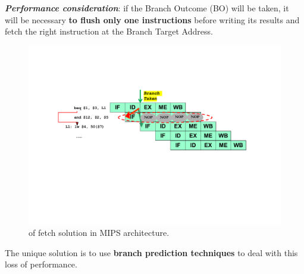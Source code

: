 \begin{itemize}
    \textbf{\emph{Performance consideration}}: if the Branch Outcome (BO) will be taken, it will be necessary \textbf{to flush only one instructions} before writing its results and fetch the right instruction at the Branch Target Address.
    \begin{figure}[!htp]
        \centering
        \includegraphics[width=\textwidth]{img/early-evalutation-of-the-pc-2.pdf}
        \caption{ of fetch solution in MIPS architecture.}
    \end{figure}
\end{itemize}
The unique solution is to use \textbf{branch prediction techniques} to deal with this loss of performance.